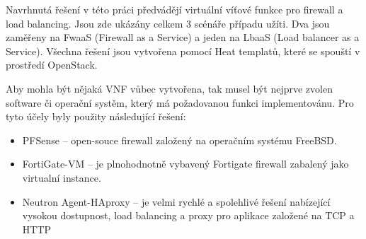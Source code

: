 Navrhnutá řešení v této práci předvádějí virtuální víťové funkce pro firewall a load balancing. Jsou zde ukázány celkem 3 scénáře případu užíti. Dva jsou zaměřeny na FwaaS (Firewall as a Service) a jeden na LbaaS (Load balancer as a Service). Všechna řešení jsou vytvořena pomocí Heat templatů, které se spouští v prostředí OpenStack.

Aby mohla být nějaká VNF vůbec vytvořena, tak musel být nejprve zvolen software či operační systěm, který má požadovanou funkci implementovánu. Pro tyto účely byly použity následující řešení:

\begin{itemize}
\item PFSense – open-souce firewall založený na operačním systému FreeBSD.
\item FortiGate-VM – je plnohodnotně vybavený Fortigate firewall zabalený jako virtualní instance.
\item Neutron Agent-HAproxy – je velmi rychlé a spolehlivé řešení nabízející vysokou dostupnost, load balancing a proxy pro aplikace založené na TCP a HTTP
\end{itemize}